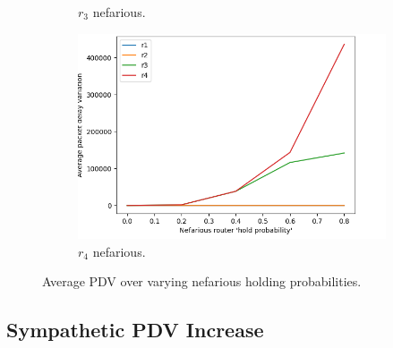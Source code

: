 \begin{figure}
\begin{subfigure}{0.475\textwidth}
        \caption[]{$r_3$ nefarious.}
    \end{subfigure}
    \begin{subfigure}{0.475\textwidth}
        \includegraphics[width=\textwidth]{figs/results/true_PDV_4.png}
        \caption[]{$r_4$ nefarious.}
    \end{subfigure}
    \caption[Results of router level PDV over varying hold probabilities.]{Average PDV over varying nefarious holding probabilities.}
    \label{fig:MrouterPDV}
\end{figure}

\subsection*{Sympathetic PDV Increase}
\label{ssec:Rsympathicpdv}

